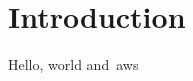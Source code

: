
\thispagestyle{plain}

\section{Introduction}\label{sec:introduction}

\normalsize
Hello, world and~\gls{aws} ~\citep{cc_overview}